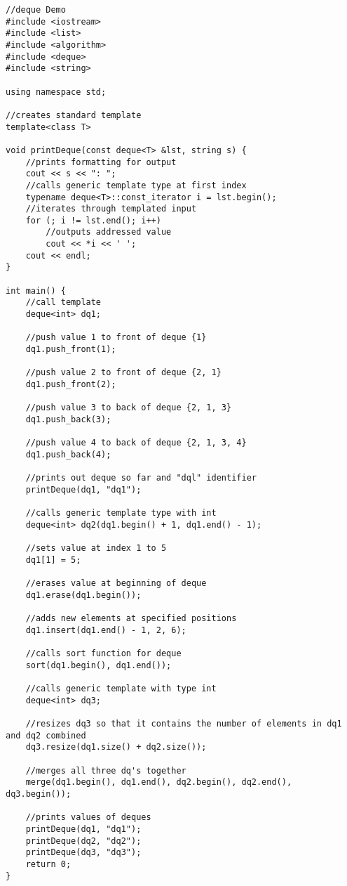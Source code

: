 \documentclass[11pt]{article}
\begin{document}
\begin{lstlisting}
//deque Demo
#include <iostream>
#include <list>
#include <algorithm>
#include <deque>
#include <string>

using namespace std;

//creates standard template
template<class T>

void printDeque(const deque<T> &lst, string s) {
    //prints formatting for output
    cout << s << ": ";
    //calls generic template type at first index
    typename deque<T>::const_iterator i = lst.begin();
    //iterates through templated input
    for (; i != lst.end(); i++)
        //outputs addressed value
        cout << *i << ' ';
    cout << endl;
}

int main() {
    //call template
    deque<int> dq1;

    //push value 1 to front of deque {1}
    dq1.push_front(1);

    //push value 2 to front of deque {2, 1}
    dq1.push_front(2);

    //push value 3 to back of deque {2, 1, 3}
    dq1.push_back(3);

    //push value 4 to back of deque {2, 1, 3, 4}
    dq1.push_back(4);

    //prints out deque so far and "dql" identifier
    printDeque(dq1, "dq1");

    //calls generic template type with int
    deque<int> dq2(dq1.begin() + 1, dq1.end() - 1);

    //sets value at index 1 to 5
    dq1[1] = 5;

    //erases value at beginning of deque
    dq1.erase(dq1.begin());

    //adds new elements at specified positions
    dq1.insert(dq1.end() - 1, 2, 6);

    //calls sort function for deque
    sort(dq1.begin(), dq1.end());

    //calls generic template with type int
    deque<int> dq3;

    //resizes dq3 so that it contains the number of elements in dq1 and dq2 combined
    dq3.resize(dq1.size() + dq2.size());

    //merges all three dq's together
    merge(dq1.begin(), dq1.end(), dq2.begin(), dq2.end(), dq3.begin());

    //prints values of deques
    printDeque(dq1, "dq1");
    printDeque(dq2, "dq2");
    printDeque(dq3, "dq3");
    return 0;
}
\end{lstlisting}
\end{document}
